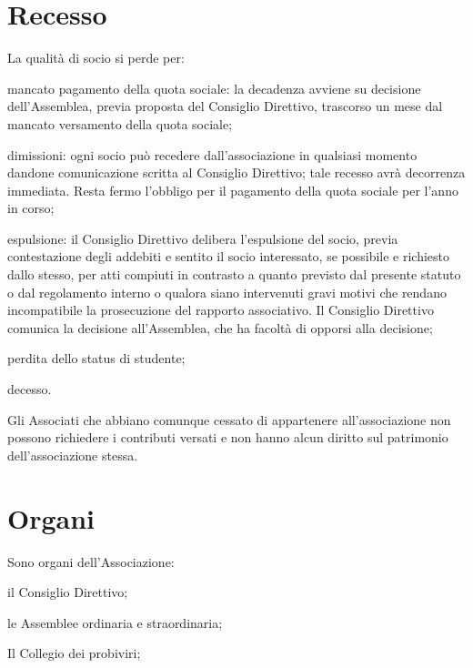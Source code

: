 \documentclass[legalpaper, 11pt]{exam}
\let\tempone\enumerate
\let\temptwo\endenumerate
\renewenvironment{enumerate}{\tempone\addtolength{\itemsep}{-0.45\baselineskip}}{\temptwo}
\begin{document}
\section{Recesso}
\begin{enumerate}
 \item La qualità di socio si perde per:
 \vspace{-5pt}
 \begin{enumerate}
  \item mancato pagamento della quota sociale: la decadenza avviene su decisione dell’Assemblea, previa proposta del Consiglio Direttivo, trascorso un mese dal mancato versamento della quota sociale;
  \item dimissioni: ogni socio può recedere dall’associazione in qualsiasi momento dandone comunicazione scritta al Consiglio Direttivo; tale recesso avrà decorrenza immediata. Resta fermo l’obbligo per il pagamento della quota sociale per l’anno in corso;
  \item espulsione: il Consiglio Direttivo delibera l’espulsione del socio, previa contestazione degli addebiti e sentito il socio interessato, se possibile e richiesto dallo stesso, per atti compiuti in contrasto a quanto previsto dal presente statuto o dal regolamento interno o qualora siano intervenuti gravi motivi che rendano incompatibile la prosecuzione del rapporto associativo. Il Consiglio Direttivo comunica la decisione all’Assemblea, che ha facoltà di opporsi alla decisione;
  \item perdita dello status di studente;
  \item decesso.
 \end{enumerate}

 \item Gli Associati che abbiano comunque cessato di appartenere all’associazione non possono richiedere i contributi versati e non hanno alcun diritto sul patrimonio dell’associazione stessa. 
\end{enumerate}

\section{Organi}
Sono organi dell’Associazione: 
\vspace{-5pt}
\begin{enumerate}
	\item il Consiglio Direttivo;
	\item le Assemblee ordinaria e straordinaria;
	\item Il Collegio dei probiviri;

\end{enumerate}
\end{document}
